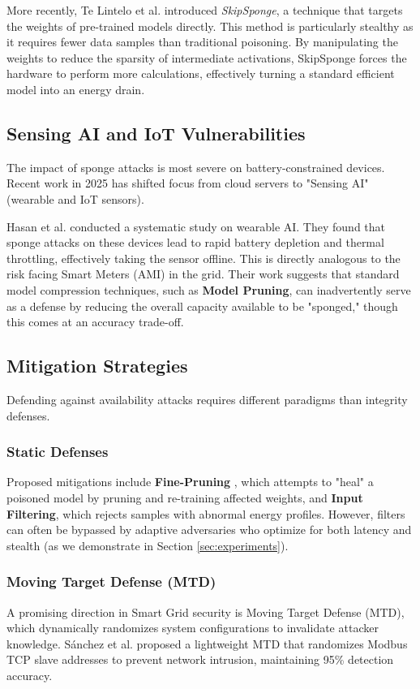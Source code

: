\documentclass[conference]{IEEEtran}
\begin{document}
More recently, Te Lintelo et al. \cite{telintelo2024skip} introduced \textit{SkipSponge}, a technique that targets the weights of pre-trained models directly. This method is particularly stealthy as it requires fewer data samples than traditional poisoning. By manipulating the weights to reduce the sparsity of intermediate activations, SkipSponge forces the hardware to perform more calculations, effectively turning a standard efficient model into an energy drain.

\subsection{Sensing AI and IoT Vulnerabilities}
The impact of sponge attacks is most severe on battery-constrained devices. Recent work in 2025 has shifted focus from cloud servers to "Sensing AI" (wearable and IoT sensors). 

Hasan et al. \cite{hasan2025sensing} conducted a systematic study on wearable AI. They found that sponge attacks on these devices lead to rapid battery depletion and thermal throttling, effectively taking the sensor offline. This is directly analogous to the risk facing Smart Meters (AMI) in the grid. Their work suggests that standard model compression techniques, such as \textbf{Model Pruning}, can inadvertently serve as a defense by reducing the overall capacity available to be "sponged," though this comes at an accuracy trade-off.

\subsection{Mitigation Strategies}
Defending against availability attacks requires different paradigms than integrity defenses.

\subsubsection{Static Defenses}
Proposed mitigations include \textbf{Fine-Pruning} \cite{telintelo2024skip}, which attempts to "heal" a poisoned model by pruning and re-training affected weights, and \textbf{Input Filtering}, which rejects samples with abnormal energy profiles. However, filters can often be bypassed by adaptive adversaries who optimize for both latency and stealth (as we demonstrate in Section \ref{sec:experiments}).

\subsubsection{Moving Target Defense (MTD)}
A promising direction in Smart Grid security is Moving Target Defense (MTD), which dynamically randomizes system configurations to invalidate attacker knowledge. S{\'a}nchez et al. \cite{sanchez2025lightweight} proposed a lightweight MTD that randomizes Modbus TCP slave addresses to prevent network intrusion, maintaining 95\% detection accuracy.
\end{document}
